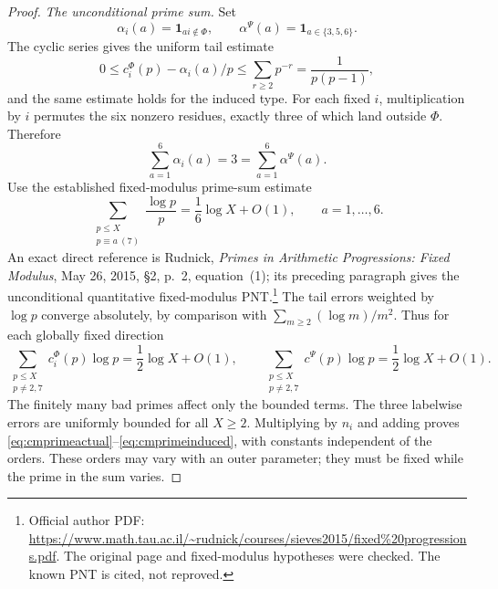 \documentclass[11pt,a4paper]{article}
\theoremstyle{definition}\newtheorem{remark}[theorem]{Remark}
\begin{document}
\begin{proof}
\emph{The unconditional prime sum.}
Set
\[
 \alpha_i(a)=\mathbf1_{ai\notin\Phi},\qquad
 \alpha^\Psi(a)=\mathbf1_{a\in\{3,5,6\}}.
\]
The cyclic series gives the uniform tail estimate
\[
 0\le c_i^\Phi(p)-\alpha_i(a)/p
       \le\sum_{r\ge2}p^{-r}=\frac1{p(p-1)},
\]
and the same estimate holds for the induced type.
For each fixed $i$, multiplication by $i$ permutes the six nonzero residues, exactly three of which land outside $\Phi$. Therefore
\[
 \sum_{a=1}^6\alpha_i(a)=3
       =\sum_{a=1}^6\alpha^\Psi(a).
\]
Use the established fixed-modulus prime-sum estimate
\begin{equation}\label{eq:cmprimeAP}
 \sum_{\substack{p\le X\\p\equiv a\ (7)}}\frac{\log p}{p}
       =\frac16\log X+O(1),\qquad a=1,\ldots,6.
\end{equation}
An exact direct reference is Rudnick, \emph{Primes in Arithmetic Progressions: Fixed Modulus}, May 26, 2015, \S2, p.~2, equation~(1); its preceding paragraph gives the unconditional quantitative fixed-modulus PNT.\footnote{Official author PDF: \url{https://www.math.tau.ac.il/~rudnick/courses/sieves2015/fixed\%20progressions.pdf}. The original page and fixed-modulus hypotheses were checked. The known PNT is cited, not reproved.}
The tail errors weighted by $\log p$ converge absolutely, by comparison with $\sum_{m\ge2}(\log m)/m^2$. Thus for each globally fixed direction
\[
 \sum_{\substack{p\le X\\p\ne2,7}}c_i^\Phi(p)\log p
       =\frac12\log X+O(1),\qquad
 \sum_{\substack{p\le X\\p\ne2,7}}c^\Psi(p)\log p
       =\frac12\log X+O(1).
\]
The finitely many bad primes affect only the bounded terms.
The three labelwise errors are uniformly bounded for all $X\ge2$.
Multiplying by $n_i$ and adding proves
\eqref{eq:cmprimeactual}--\eqref{eq:cmprimeinduced}, with constants independent of the orders. These orders may vary with an outer parameter; they must be fixed while the prime in the sum varies.


\end{proof}
\end{document}
